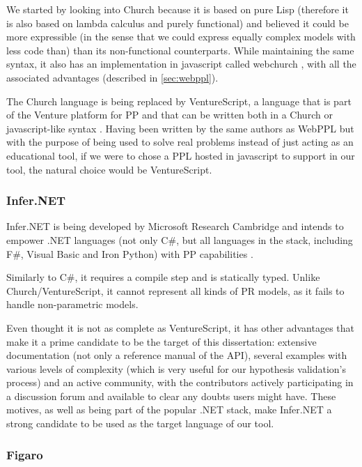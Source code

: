 \begin{itemsize}
We started by looking into Church because it is based on pure Lisp (therefore
it is also based on lambda calculus and purely functional) \cite{Goodman2008} and believed it could
be more expressible (in the sense that we could express equally complex models
with less code than) than its non-functional counterparts. While maintaining the same syntax,
it also has an implementation in javascript called webchurch \cite{church},
with all the associated advantages (described in \ref{sec:webppl}).

The Church language is being replaced by VentureScript, a language that is part
of the Venture platform for PP and that can be written both in a Church or javascript-like
syntax \cite{probcomp}. Having been written by the same authors as WebPPL but
with the purpose of being used to solve real problems instead of just acting as
an educational tool, if we were to chose a PPL hosted in javascript to support
in our tool, the natural choice would be VentureScript.

\subsubsection{Infer.NET}

Infer.NET is being developed by Microsoft Research Cambridge and intends to
empower .NET languages (not only C#, but all languages in the stack, including
F#, Visual Basic and Iron Python) with PP capabilities \cite{InferNET14}.

Similarly to C#, it requires a compile step and is statically typed. Unlike
Church/VentureScript, it cannot represent all kinds of PR models, as it fails to handle
non-parametric models.

Even thought it is not as complete as VentureScript, it has other advantages
that make it a prime candidate to be the target of this dissertation: extensive
documentation (not only a reference manual of the API), several examples with
various levels of complexity (which is very useful for our hypothesis validation's
process) and an active community, with the contributors
actively participating in a discussion forum and available to clear any doubts
users might have. These motives, as well as being part of the popular .NET
stack, make Infer.NET a strong candidate to be used as the target language of our tool.

\subsubsection{Figaro}


\end{itemsize}

